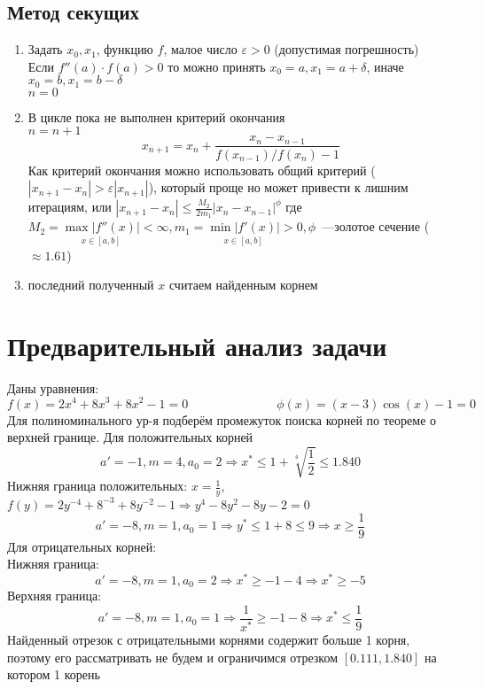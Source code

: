 \documentclass[a4paper]{article}
\let\epsilon\varepsilon
\begin{document}
\subsection{Метод секущих}
\begin{enumerate}
  \item Задать $x_{0},x_{1}$, функцию $f$, малое число $\epsilon >0$ (допустимая погрешность)\\
        Если $f''(a) \cdot f(a) >0$ то можно принять $x_{0} = a, x_{1} = a+\delta$, иначе $x_{0}=b, x_{1} = b-\delta$\\
        $n=0$
  \item В цикле пока не выполнен критерий окончания\\
        $n=n+1$
        \[
        x_{n+1} = x_{n} + \frac{x_{n}-x_{n-1}}{f(x_{n-1})/f(x_{n})-1}
        \]
        Как критерий окончания можно использовать общий критерий ($|x_{n+1}-x_{n}| > \epsilon|x_{n+1}|$), который проще но может привести к лишним итерациям, или $|x_{n+1}-x_{n}| \leq \frac{M_{2}}{2m_{1}}|x_{n}-x_{n-1}|^{\phi}$
        где $M_{2} = \underset{x \in [a,b]}{\max{|f''(x)|}} < \infty, m_{1} = \underset{x \in [a,b]}{\min{|f'(x)|}}>0, \phi$~---золотое сечение ($\approx 1.61$)
  \item последний полученный $x$ считаем найденным корнем
\end{enumerate}
\section{Предварительный анализ задачи}
Даны уравнения: \[
  f(x) = 2x^{4} + 8x^{3} + 8x^{2} -1=0 \hspace{3cm} \phi(x) = (x-3)\cos(x)-1 =0
\]
Для полиноминального ур-я подберём промежуток поиска корней по теореме о верхней границе. Для положительных корней \[
  a' = -1, m = 4, a_{0} = 2 \Rightarrow x^{*} \leq 1 + \sqrt[4]{ \frac{1}{2} } \leq 1.840
\]
Нижняя граница положительных: $x = \frac{1}{y}$, $f(y) = 2y^{-4}+8^{-3}+8y^{-2}-1 \Rightarrow y^{4}-8y^{2}-8y-2 =0$
\[
  a' = -8, m=1, a_{0} = 1 \Rightarrow y^{*} \leq 1 + 8 \leq 9 \Rightarrow x \geq \frac{1}{9}
\]
Для отрицательных корней:\\
Нижняя граница: \[
  a' = -8, m=1, a_{0}=2 \Rightarrow x^{*} \geq -1 - 4 \Rightarrow x^{*} \geq -5
\]
Верхняя граница: \[
  a' = -8, m=1, a_{0}=1 \Rightarrow \frac{1}{x^{*}} \geq -1 -8 \Rightarrow x^{*} \leq \frac{1}{9}
\]
Найденный отрезок с отрицательными корнями содержит больше 1 корня, поэтому его рассматривать не будем и ограничимся отрезком $[0.111,1.840]$ на котором 1 корень
\end{document}
